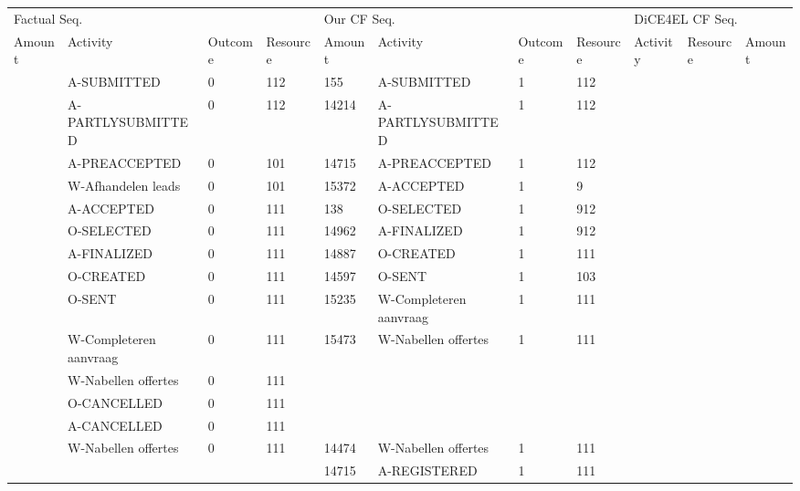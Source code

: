 \begin{tabular}{lllllllllll}
\toprule
\multicolumn{4}{l}{Factual Seq.} & \multicolumn{4}{l}{Our CF Seq.} & \multicolumn{3}{l}{DiCE4EL CF Seq.} \\
Amount & Activity & Outcome & Resource & Amount & Activity & Outcome & Resource & Activity & Resource & Amount \\
\midrule
 & A-SUBMITTED & 0 & 112 & 155 & A-SUBMITTED & 1 & 112 &  &  &  \\
 & A-PARTLYSUBMITTED & 0 & 112 & 14214 & A-PARTLYSUBMITTED & 1 & 112 &  &  &  \\
 & A-PREACCEPTED & 0 & 101 & 14715 & A-PREACCEPTED & 1 & 112 &  &  &  \\
 & W-Afhandelen leads & 0 & 101 & 15372 & A-ACCEPTED & 1 & 9 &  &  &  \\
 & A-ACCEPTED & 0 & 111 & 138 & O-SELECTED & 1 & 912 &  &  &  \\
 & O-SELECTED & 0 & 111 & 14962 & A-FINALIZED & 1 & 912 &  &  &  \\
 & A-FINALIZED & 0 & 111 & 14887 & O-CREATED & 1 & 111 &  &  &  \\
 & O-CREATED & 0 & 111 & 14597 & O-SENT & 1 & 103 &  &  &  \\
 & O-SENT & 0 & 111 & 15235 & W-Completeren aanvraag & 1 & 111 &  &  &  \\
 & W-Completeren aanvraag & 0 & 111 & 15473 & W-Nabellen offertes & 1 & 111 &  &  &  \\
 & W-Nabellen offertes & 0 & 111 &  &  &  &  &  &  &  \\
 & O-CANCELLED & 0 & 111 &  &  &  &  &  &  &  \\
 & A-CANCELLED & 0 & 111 &  &  &  &  &  &  &  \\
 & W-Nabellen offertes & 0 & 111 & 14474 & W-Nabellen offertes & 1 & 111 &  &  &  \\
 &  &  &  & 14715 & A-REGISTERED & 1 & 111 &  &  &  \\
\bottomrule
\end{tabular}
